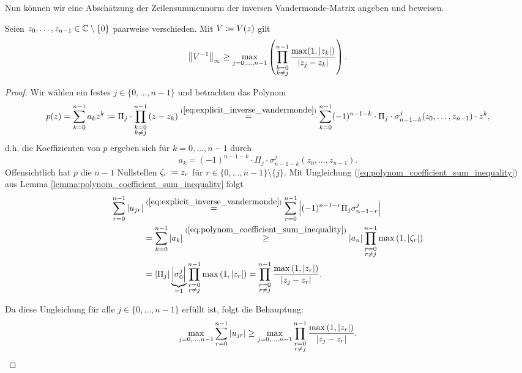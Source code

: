 \noindent Nun können wir eine Abschätzung der Zeilensummennorm der inversen
Vandermonde-Matrix angeben und beweisen.
\begin{theorem}
  \label{thm:inverse_vandermonde_lower_bound}
  Seien $z_0, \dots, z_{n-1} \in \mathbb{C}\setminus\{0\}$ paarweise verschieden.
  Mit $V \coloneqq V \! \left( z \right)$ gilt
  \begin{equation}
    \label{eq:inverse_vandermonde_lower_bound}
    \left\lVert V^{-1} \right\rVert_{\infty}
    \geq \max_{j = 0, \dots, n-1} \left( \prod_{\substack{k = 0\\ k \neq j}}^{n-1} \frac{\max(1, \left\lvert z_k \right\rvert)}{\left\lvert z_j - z_k \right\rvert} \right).
  \end{equation}
\end{theorem}
\begin{proof}
    \noindent Wir wählen ein festes
    $j \in \{0, \dots, n-1\}$ und betrachten das Polynom
    \[
        p(z) = \sum_{k=0}^{n-1} a_k z^k
        \coloneqq \Pi_j \cdot \prod_{\substack{k=0\\ k \neq j}}^{n-1} \left( z - z_k \right)
        \overset{(\ref{eq:explicit_inverse_vandermonde})}{=} \sum_{k=0}^{n-1} (-1)^{n-1-k} \cdot \Pi_j \cdot \sigma_{n-1-k}^j(z_0, \dots, z_{n-1}) \cdot z^k,
    \]
    d.h. die Koeffizienten von $p$ ergeben sich für $k = 0, \dots, n-1$ durch
    \[
        a_k = (-1)^{n-1-k} \cdot \Pi_j \cdot \sigma_{n-1-k}^j(z_0, \dots, z_{n-1}).
    \]
    Offensichtlich hat $p$ die $n-1$ Nullstellen
    $\zeta_r \coloneqq z_r$ für $r \in \{0,\dots,n-1\} \setminus \{j\}$.
    Mit Ungleichung (\ref{eq:polynom_coefficient_sum_inequality}) aus Lemma
    \ref{lemma:polynom_coefficient_sum_inequality} folgt
    \[
        \begin{split}
            \sum_{r=0}^{n-1} \left\lvert u_{jr} \right\rvert
            &\overset{(\ref{eq:explicit_inverse_vandermonde})}{=}
            \sum_{r=0}^{n-1} \left\lvert (-1)^{n-1-r} \Pi_j \sigma_{n-1-r}^j \right\rvert\\
            &= \sum_{k=0}^{n-1} \left\lvert a_k \right\rvert
            \overset{(\ref{eq:polynom_coefficient_sum_inequality})}{\geq}
                \left\lvert a_{n} \right\rvert \prod_{\substack{r=0\\ r \neq j}}^{n-1} \max \left(1, \left\lvert \zeta_r \right\rvert \right)\\
            &= \left\lvert \Pi_j \right\rvert \underbrace{\left\lvert \sigma_0^j \right\rvert}_{=1} \prod_{\substack{r=0\\ r \neq j}}^{n-1} \max \left(1, \left\lvert z_r \right\rvert \right)
            = \prod_{\substack{r=0\\ r \neq j}}^{n-1} \frac{\max \left(1, \left\lvert z_r \right\rvert \right)}{\left\lvert z_j - z_r \right\rvert}.
        \end{split}
    \]

    \noindent Da diese Ungleichung für alle $j \in \{0, \dots, n-1\}$ erfüllt
    ist, folgt die Behauptung:
    \[
        \max_{j = 0, \dots, n-1} \sum_{r=0}^{n-1} \left\lvert u_{jr} \right\rvert
        \geq \max_{j = 0, \dots, n-1} \prod_{\substack{r=0\\ r \neq j}}^{n-1} \frac{\max \left(1, \left\lvert z_r \right\rvert \right)}{\left\lvert z_j - z_r \right\rvert}.
    \]
\end{proof}
